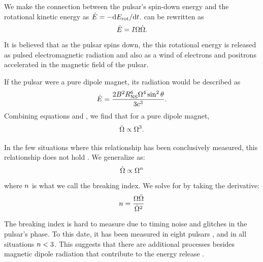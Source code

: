 We make the connection between the pulsar's spin-down
energy and the rotational kinetic energy as $\dot{E}
= - \text{d}E_\text{rot}/\text{d}t$.
 can be rewritten as
\begin{equation}\eqnlabel{edot_from_rotation}
  \energydot = I \PulsarAngularFrequency \PulsarAngularFrequencyDot.
\end{equation}
It is believed that as the pulsar spins down, the this rotational energy
is released as pulsed electromagnetic radiation and also as a wind of
electrons and positrons accelerated in the magnetic field of the pulsar.

If the pulsar were a pure dipole magnet, its radiation would be described
as \citep{gunn_1969_magnetic-dipole}
\begin{equation}\eqnlabel{edot_pure_dipole}
  \energydot = \frac{2\MagneticField^2 \PulsarRadius^6 
  \PulsarAngularFrequency^4 \sin^2\PulsarRotationAngle}{
  3\speedoflight^3}.
\end{equation}
Combining equations  and
, we find that for a pure dipole magnet,
\begin{equation}\eqnlabel{breaking_index_dipole}
  \PulsarAngularFrequencyDot \propto \PulsarAngularFrequency^3.
\end{equation}

In the few situations where this relationship has been
conclusively measured, this relationship does not hold
\citep[See][ and references therein]{espinoza_2011_braking-index}.
We generalize  as:
\begin{equation}\eqnlabel{angular_frequency_derivative_relation}
  \PulsarAngularFrequencyDot \propto \PulsarAngularFrequency^\breakingindex
\end{equation}
where $n$ is what we call the breaking index.
We solve 
for \breakingindex by taking the derivative:
\begin{equation}
  n = \frac{\Omega \ddot{\Omega}}{\dot{\Omega}^2}
\end{equation}

The breaking index is hard to measure due to timing noise and glitches
in the pulsar's phase. To this date, it has been measured in eight
pulsars \cite{espinoza_2011_braking-index}, and in all situations
$n<3$. This suggests that there are additional processes
besides magnetic dipole radiation that contribute to the energy release
\citep{blandford_1988_interpretation-pulsar}.

